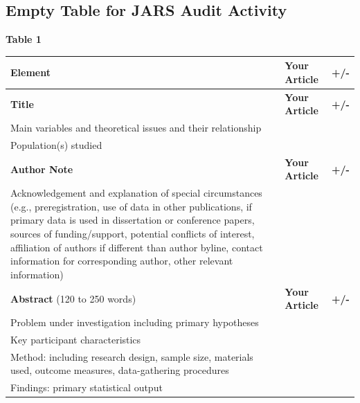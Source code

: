 \documentclass[
  11pt,
]{book}
\newcounter{none} %
\begin{document}
\subsection{Empty Table for JARS Audit Activity}\label{empty-table-for-jars-audit-activity}

\textbf{Table 1}

{\def\LTcaptype{none} %
\begin{longtable}[]{@{}
  >{\raggedright\arraybackslash}p{}
  >{\raggedright\arraybackslash}p{}
  >{\centering\arraybackslash}p{}@{}}
\toprule\noalign{}
\begin{minipage}[b]{\linewidth}\raggedright
Element
\end{minipage} & \begin{minipage}[b]{\linewidth}\raggedright
Your Article
\end{minipage} & \begin{minipage}[b]{\linewidth}\centering
+/-
\end{minipage} \\
\midrule\noalign{}
\endhead
\bottomrule\noalign{}
\endlastfoot
\textbf{Title} & \textbf{Your Article} & \textbf{+/-} \\
Main variables and theoretical issues and their relationship & & \\
Population(s) studied & & \\
\textbf{Author Note} & \textbf{Your Article} & \textbf{+/-} \\
Acknowledgement and explanation of special circumstances (e.g., preregistration, use of data in other publications, if primary data is used in dissertation or conference papers, sources of funding/support, potential conflicts of interest, affiliation of authors if different than author byline, contact information for corresponding author, other relevant information) & & \\
\textbf{Abstract} (120 to 250 words) & \textbf{Your Article} & \textbf{+/-} \\
Problem under investigation including primary hypotheses & & \\
Key participant characteristics & & \\
Method: including research design, sample size, materials used, outcome measures, data-gathering procedures & & \\
Findings: primary statistical output & & \\

\end{longtable}}
\end{document}
